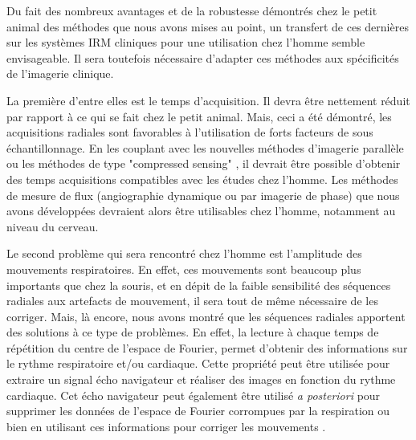 \medskip

Du fait des nombreux avantages et de la robustesse démontrés chez le petit animal des méthodes que nous avons mises au point, un transfert de ces dernières sur les systèmes IRM cliniques pour une utilisation chez l'homme semble envisageable. Il sera toutefois nécessaire d'adapter ces méthodes aux spécificités de l'imagerie clinique.

La première d'entre elles est le temps d'acquisition. Il devra être nettement réduit par rapport à ce qui se fait chez le petit animal. Mais, ceci a été démontré, les acquisitions radiales sont favorables à l'utilisation de forts facteurs de sous échantillonnage. En les couplant avec les nouvelles méthodes d'imagerie parallèle \cite{Lustig:2010fk,Wright:2014aa} ou les méthodes de type "compressed sensing" \cite{Lustig:2008ty,Chan:2012fk,Nam:2013nx}, il devrait être possible d'obtenir des temps acquisitions compatibles avec les études chez l'homme. Les méthodes de mesure de flux (angiographie dynamique ou par imagerie de phase) que nous avons développées devraient alors être utilisables chez l'homme, notamment au niveau du cerveau.

Le second problème qui sera rencontré chez l'homme est l'amplitude des mouvements respiratoires. En effet, ces mouvements sont beaucoup plus importants que chez la souris, et en dépit de la faible sensibilité des  séquences radiales aux artefacts de mouvement, il sera tout de même nécessaire de les corriger. Mais, là encore, nous avons montré que les séquences radiales apportent des solutions à ce type de problèmes. En effet, la lecture à chaque temps de répétition du centre de l'espace de Fourier, permet d'obtenir des informations sur le rythme respiratoire et/ou cardiaque. Cette propriété peut être utilisée pour extraire un signal écho navigateur et réaliser des images en fonction du rythme cardiaque. Cet écho navigateur peut également être utilisé \textit{a posteriori} pour supprimer les données de l'espace de Fourier corrompues par la respiration ou bien en utilisant ces informations pour corriger les mouvements \cite{welch2004self,vaillant2014retrospective}.
\medskip

